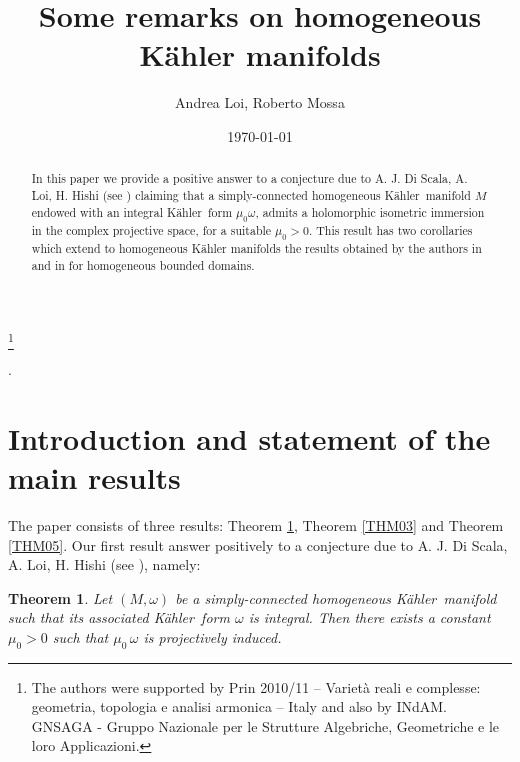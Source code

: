 \documentclass[reqno]{amsart}
\newtheorem{thm}{Theorem}[section]
\begin{document}
\author[A. Loi, R. Mossa]{Andrea Loi,  Roberto Mossa}
\address{Dipartimento di Matematica e Informatica, Universit\`{a} di Cagliari,
Via Ospedale 72, 09124 Cagliari, Italy}
\thanks{The authors were  supported by Prin 2010/11 -- Variet\`a reali e complesse: geometria, topologia e analisi armonica -- Italy and also by INdAM. GNSAGA - Gruppo Nazionale per le Strutture Algebriche, Geometriche e le loro Applicazioni.}
\date{\today}
.

\begin{abstract}
In this paper we provide a positive answer to a conjecture due to {A. J. Di Scala}, { A. Loi}, {H. Hishi} (see \cite[Conjecture 1]{dlh}) claiming that a simply-connected homogeneous {K\"{a}hler}\ manifold $M$ endowed with an integral {K\"{a}hler}\ form  $\mu_0\omega$, admits a holomorphic isometric immersion in the complex projective space, for a suitable $\mu_0>0$. This result has two corollaries which extend  to   homogeneous K\"ahler manifolds  the results obtained by the authors in \cite{LM03} and in \cite{M04} for homogeneous bounded domains.
\end{abstract}

\title[Some remarks on homogeneous K\"ahler manifolds]
{Some remarks on homogeneous K\"ahler manifolds}

\maketitle

\section{Introduction and statement of the main results}
The paper consists of three results: Theorem \ref{THM04}, Theorem \ref{THM03}  and Theorem   \ref{THM05}. Our first result answer positively to a conjecture due to {A. J. Di Scala}, { A. Loi}, {H. Hishi} (see \cite[Conjecture 1]{dlh}), namely:
\begin{thm}\label{THM04}
Let $(M, \omega)$ be a simply-connected homogeneous {K\"{a}hler}\ manifold such that its  associated {K\"{a}hler}\ form  $\omega$ is integral.
Then  there exists a constant $\mu_0  > 0$ such that $\mu_0 \, \omega$  is  projectively induced.
\end{thm}
\end{document}
